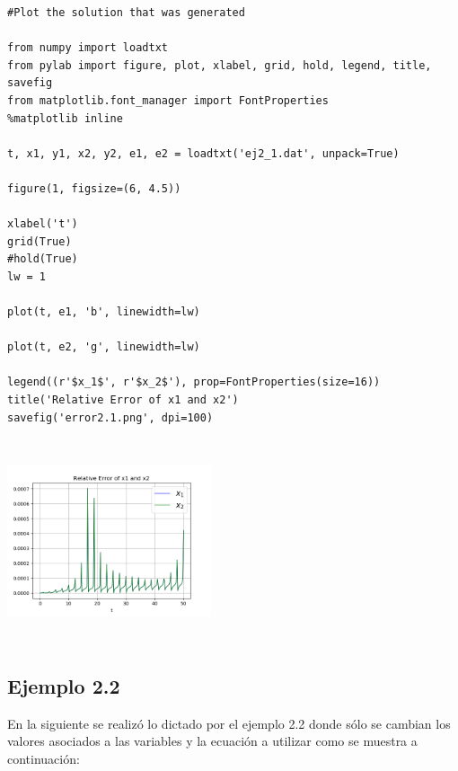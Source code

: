 \documentclass{article}
\begin{document}
\begin{verbatim}
#Plot the solution that was generated

from numpy import loadtxt
from pylab import figure, plot, xlabel, grid, hold, legend, title, savefig
from matplotlib.font_manager import FontProperties
%matplotlib inline

t, x1, y1, x2, y2, e1, e2 = loadtxt('ej2_1.dat', unpack=True)

figure(1, figsize=(6, 4.5))

xlabel('t')
grid(True)
#hold(True)
lw = 1

plot(t, e1, 'b', linewidth=lw)

plot(t, e2, 'g', linewidth=lw)

legend((r'$x_1$', r'$x_2$'), prop=FontProperties(size=16))
title('Relative Error of x1 and x2')
savefig('error2.1.png', dpi=100)

\end{verbatim}

\begin{center}
  \includegraphics[width=6cm, height=6cm]{error21.png}
\end{center}


\subsection{Ejemplo 2.2}

En la siguiente se realizó lo dictado por el ejemplo 2.2 donde sólo se cambian los valores asociados a las variables y la ecuación a utilizar como se muestra a continuación:
\end{document}
